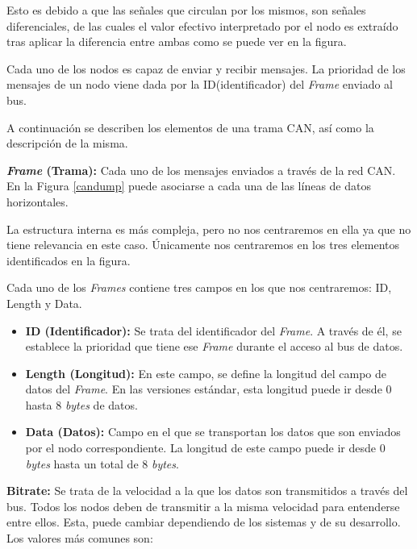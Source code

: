 Esto es debido a que las señales que circulan por los mismos, son señales diferenciales, de las cuales el valor efectivo interpretado por el nodo es extraído tras aplicar la diferencia entre ambas como se puede ver en la figura.


Cada uno de los nodos es capaz de enviar y recibir mensajes. La prioridad de los mensajes de un nodo viene dada por la ID(identificador) del \emph{Frame} enviado al bus.


A continuación se describen los elementos de una trama CAN, así como la descripción de la misma.

\textbf{\emph{Frame} (Trama):} Cada uno de los mensajes enviados a través de la red CAN. En la Figura \ref{candump} puede asociarse a cada una de las líneas de datos horizontales.

La estructura interna es más compleja, pero no nos centraremos en ella ya que no tiene relevancia en este caso. Únicamente nos centraremos en los tres elementos identificados en la figura.

Cada uno de los \emph{Frames} contiene tres campos en los que nos centraremos: ID, Length y Data.

\begin{itemize}
\item
\textbf{ID (Identificador):} Se trata del identificador del \emph{Frame}. A través de él, se establece la prioridad que tiene ese \emph{Frame} durante el acceso al bus de datos.
\item
\textbf{Length (Longitud):} En este campo, se define la longitud del campo de datos del \emph{Frame}. En las versiones estándar, esta longitud puede ir desde 0 hasta 8 \emph{bytes} de datos.
\item
\textbf{Data (Datos):} Campo en el que se transportan los datos que son enviados por el nodo correspondiente. La longitud de este campo puede ir desde 0 \emph{bytes} hasta un total de 8 \emph{bytes}.
\end{itemize}



\textbf{Bitrate:} Se trata de la velocidad a la que los datos son transmitidos a través del bus. Todos los nodos deben de transmitir a la misma velocidad para entenderse entre ellos. Esta, puede cambiar dependiendo de los sistemas y de su desarrollo.
Los valores más comunes son:

